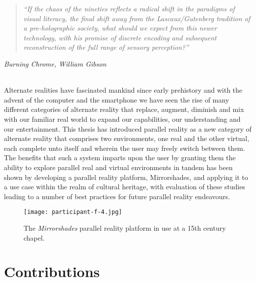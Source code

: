 \begin{quote}
	\textit{``If the chaos of the nineties reflects a radical shift in the paradigms of visual literacy, the final shift away from the Lascaux/Gutenberg tradition of a pre-holographic society, what should we expect from this newer technology, with his promise of discrete encoding and subsequent reconstruction of the full range of sensory perception?''}
\end{quote}
\hfill \textit{Burning Chrome, William Gibson}
\\
\\


\label{chapter-conclusions}

Alternate realities have fascinated mankind since early prehistory and with the advent of the computer and the smartphone we have seen the rise of many different categories of alternate reality that replace, augment, diminish and mix with our familiar real world to expand our capabilities, our understanding and our entertainment. This thesis has introduced parallel reality as a new category of alternate reality that comprises two environments, one real and the other virtual, each complete unto itself and wherein the user may freely switch between them. The benefits that such a system imparts upon the user by granting them the ability to explore parallel real and virtual environments in tandem has been shown by developing a parallel reality platform, Mirrorshades, and applying it to a use case within the realm of cultural heritage, with evaluation of these studies leading to a number of best practices for future parallel reality endeavours.

\begin{figure}[h]
	\begin{center}
		\texttt{[image: participant-f-4.jpg]}
		\caption{The \textit{Mirrorshades} parallel reality platform in use at a 15th century chapel.}
		\label{participant-f-4.jpg}
	\end{center}	
\end{figure}


\section{Contributions}

